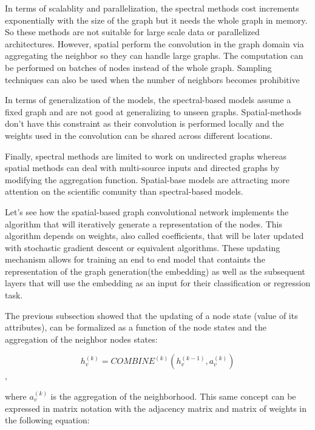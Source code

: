 In terms of scalablity and parallelization, the spectral methods  cost increments exponentially with the size of the graph but it needs the whole graph in memory. So these methods are not suitable for large scale data or parallelized architectures. However, spatial perform the convolution in the graph domain via aggregating the neighbor so they can handle large graphs. The computation can be performed on batches of nodes instead of the whole graph. Sampling techniques can also be used when the number of neighbors becomes prohibitive

In terms of generalization of the models, the spectral-based models assume a fixed graph and are not good at generalizing to unseen graphs. Spatial-methods don't have this constraint as their convolution is performed locally and the weights used in the convolution can be shared across different locations.

Finally, spectral methods are limited to work on undirected graphs whereas spatial methods can deal with multi-source inputs and directed graphs by modifying the aggregation function. Spatial-base models are attracting more attention on the scientific comunity than spectral-based models.




Let's see how the spatial-based graph convolutional network implements the algorithm that will iteratively generate a representation of the nodes. This algorithm depends on weights, also called coefficients, that will be later updated with stochastic gradient descent or equivalent algorithms. These updating mechanism allows for training an end to end model that containts the representation of the graph generation(the embedding) as well as the subsequent layers that will use the embedding as an input for their classification or regression task.

The previous subsection showed that the updating of a node state (value of its attributes), can be formalized as a function of the node states and the aggregation of the neighbor nodes states:

 $$ h_v^{(k)} = COMBINE^{(k)}(h_v^{(k-1)}, a_v^{(k)})$$,

where $a_v^{(k)}$ is the aggregation of the neighborhood. This same concept can be expressed in matrix notation with the adjacency matrix and matrix of weights in the following equation:


